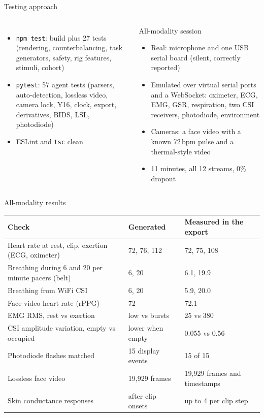 \documentclass[aspectratio=169,11pt]{beamer}
\newcommand{\code}[1]{{\small\texttt{#1}}}
\begin{document}
\begin{frame}{Testing approach}
  \begin{columns}[T]
    \begin{itemize}\small
      \item \code{npm test}: build plus 27 tests (rendering, counterbalancing, task generators, safety, rig features, stimuli, cohort)
      \item \code{pytest}: 57 agent tests (parsers, auto-detection, lossless video, camera lock, Y16, clock, export, derivatives, BIDS, LSL, photodiode)
      \item ESLint and \code{tsc} clean
    \end{itemize}
    \begin{block}{All-modality session}
      \footnotesize
      \begin{itemize}
        \item Real: microphone and one USB serial board (silent, correctly reported)
        \item Emulated over virtual serial ports and a WebSocket: oximeter, ECG, EMG, GSR, respiration, two CSI receivers, photodiode, environment
        \item Cameras: a face video with a known 72\,bpm pulse and a thermal-style video
        \item 11 minutes, all 12 streams, 0\% dropout
      \end{itemize}
    \end{block}
  \end{columns}
\end{frame}

\begin{frame}{All-modality results}
  \centering
  \small
  \begin{tabular}{@{}l l l@{}}
    \toprule
    Check & Generated & Measured in the export \\
    \midrule
    Heart rate at rest, clip, exertion (ECG, oximeter) & 72, 76, 112 & 72, 75, 108 \\
    Breathing during 6 and 20 per minute pacers (belt) & 6, 20 & 6.1, 19.9 \\
    Breathing from WiFi CSI & 6, 20 & 5.9, 20.0 \\
    Face-video heart rate (rPPG) & 72 & 72.1 \\
    EMG RMS, rest vs exertion & low vs bursts & 25 vs 380 \\
    CSI amplitude variation, empty vs occupied & lower when empty & 0.055 vs 0.56 \\
    Photodiode flashes matched & 15 display events & 15 of 15 \\
    Lossless face video & 19,929 frames & 19,929 frames and timestamps \\
    Skin conductance responses & after clip onsets & up to 4 per clip step \\
    \bottomrule
  \end{tabular}
\end{frame}
\end{document}
